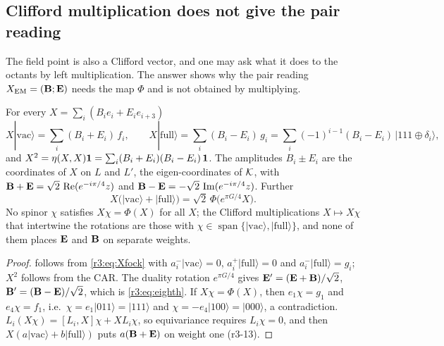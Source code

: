 \subsection{Clifford multiplication does not give the pair reading}
\label{r3:sec:poles}

The field point is also a Clifford vector, and one may ask what it does to the octants by left multiplication. The answer shows why the
pair reading $X_{\rm EM}=(\mathbf B;\mathbf E)$ needs the map $\Phi$ and is not obtained by multiplying.

\begin{proposition}
\label{r3:prop:poles}
For every $X=\sum_i(B_ie_i+E_ie_{i+3})$
\begin{equation}
\label{r3:eq:poles}
X|\mathrm{vac}\rangle=\sum_i(B_i+E_i)\,f_i,\qquad X|\mathrm{full}\rangle=\sum_i(B_i-E_i)\,g_i=\sum_i(-1)^{i-1}(B_i-E_i)\,|111\oplus\delta_i\rangle ,
\end{equation}
and $X^2=\eta(X,X)\mathbf 1=\sum_i(B_i+E_i)(B_i-E_i)\,\mathbf 1$. The amplitudes $B_i\pm E_i$ are the coordinates of $X$ on $L$ and $L'$, the eigen-coordinates of
$\mathcal K$, with $\mathbf B+\mathbf E=\sqrt2\,\operatorname{Re}(e^{-i\pi/4}z)$ and $\mathbf B-\mathbf E=-\sqrt2\,\operatorname{Im}(e^{-i\pi/4}z)$. Further
\begin{equation}
\label{r3:eq:eighth}
X\bigl(|\mathrm{vac}\rangle+|\mathrm{full}\rangle\bigr)=\sqrt2\,\Phi\bigl(e^{\pi G/4}X\bigr).
\end{equation}
No spinor $\chi$ satisfies $X\chi=\Phi(X)$ for all $X$; the Clifford multiplications $X\mapsto X\chi$ that intertwine the rotations are those with
$\chi\in\operatorname{span}\{|\mathrm{vac}\rangle,|\mathrm{full}\rangle\}$, and none of them places $\mathbf E$ and $\mathbf B$ on separate weights.
\end{proposition}

\begin{proof}
 follows from \cref{r3:eq:Xfock} with $a^-_i|\mathrm{vac}\rangle=0$, $a^+_i|\mathrm{full}\rangle=0$ and $a^-_i|\mathrm{full}\rangle=g_i$; $X^2$ follows from the
CAR. The duality rotation $e^{\pi G/4}$ gives $\mathbf E'=(\mathbf E+\mathbf B)/\sqrt2$, $\mathbf B'=(\mathbf B-\mathbf E)/\sqrt2$, which is \cref{r3:eq:eighth}. If $X\chi=\Phi(X)$, then
$e_1\chi=g_1$ and $e_4\chi=f_1$, i.e.\ $\chi=e_1|011\rangle=|111\rangle$ and $\chi=-e_4|100\rangle=|000\rangle$, a contradiction. $L_i(X\chi)=[L_i,X]\chi+XL_i\chi$, so
equivariance requires $L_i\chi=0$, and then $X(a|\mathrm{vac}\rangle+b|\mathrm{full}\rangle)$ puts $a(\mathbf B+\mathbf E)$ on weight one (r3-13).
\end{proof}

